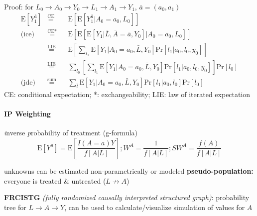 \documentclass[8pt,twoside]{extarticle}
\begin{document}
\begin{multicols}{2}
\begin{mdframed}[style=MyFrame,nobreak=true, innerleftmargin=2pt, innerrightmargin=2pt]
Proof: for $L_0 \rightarrow A_0 \rightarrow Y_0 \rightarrow L_1 \rightarrow A_1 \rightarrow Y_1$, $\bar{a} =(a_0,a_1)$ 
\begin{alignat*}{4} 
\mathrm{E}\left[Y_1^{\bar{a}}\right] & \overset{\text{CE}}{=} && \mathrm{E}\left[\mathrm{E}\left[   Y_1^{\bar{a}}|A_0{=}a_0, L_0   \right]\right]  \\ 
\text{(ice)}\,\,\, &\overset{\text{CE*}}{=} && \mathrm{E}\left[\mathrm{E}\left[  \mathrm{E}\left[Y_1|\bar{L}, \bar{A}{=}\bar{a}, Y_0 \right]| A_0{=}a_0, L_0   \right]\right]  \\ 
&\overset{\text{LIE}}{=} && \mathrm{E}\left[ \sum\nolimits_{l_1} \mathrm{E}\left[Y_1|A_0{=}a_0, \bar{L}, Y_0\right] \mathrm{Pr}\left[l_1|a_0,l_0, y_0\right]         \right] \\
&\overset{\text{LIE}}{=} && \sum\nolimits_{l_0}\!\!\!\left[ \sum\nolimits_{l_1} \!\!\!\mathrm{E}\left[Y_1|A_0{=}a_0, \bar{L}, Y_0\right] \mathrm{Pr}\left[l_1|a_0,l_0, y_0\right]         \right] \mathrm{Pr}\left[l_0\right] \\
\text{(jde)}\,\,\, &\overset{\text{sum}}{=} &&  \sum\nolimits_{\bar{l}} \mathrm{E}\left[Y_1|A_0{=}a_0, \bar{L}, Y_0\right] \mathrm{Pr}\left[l_1|a_0,l_0\right]          \mathrm{Pr}\left[l_0\right] 
\end{alignat*}
CE: conditional expectation; *: exchangeability; \newline LIE: law of iterated expectation
\end{mdframed}







\paragraph{IP Weighting} \textit{i}nverse \textit{p}robability of treatment (g-formula)
$$\mathrm{E}\left[Y^{a}\right] = \mathrm{E}\left[\frac{I(A=a)Y}{f\left[A|L\right]}\right]; W^A=\frac{1}{f\left[A|L\right]}; SW^A = \frac{f(A)}{f\left[A|L\right]}$$

 unknowns can be estimated non-parametrically or modeled
 \textbf{pseudo-population:} everyone is treated \& untreated ($L\not\to A$)

 \textbf{FRCISTG} \textit{(fully randomized causally interpreted structured graph)}: probability tree for $L \rightarrow A \rightarrow Y$, can be used to calculate/visualize simulation of values for $A$ 


\end{multicols}
\end{document}
